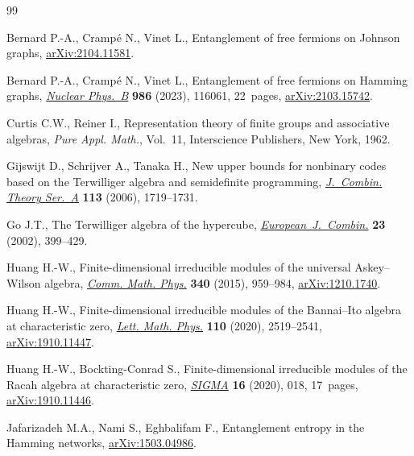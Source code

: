 \documentclass[10pt,a4paper]{amsart}
\numberwithin{equation}{section}
\begin{document}
\begin{thebibliography}{99}
\footnotesize\itemsep=0pt

Bernard P.-A., Cramp\'e N., Vinet L., Entanglement of free fermions on Johnson
 graphs, \href{https://arxiv.org/abs/2104.11581}{arXiv:2104.11581}.

Bernard P.-A., Cramp\'e N., Vinet L., Entanglement of free fermions on {H}amming
 graphs, \href{https://doi.org/10.1016/j.nuclphysb.2022.116061}{\textit{Nuclear Phys.~B}} \textbf{986} (2023), 116061, 22~pages,
 \href{https://arxiv.org/abs/2103.15742}{arXiv:2103.15742}.

Curtis C.W., Reiner I., Representation theory of finite groups and associative
 algebras, \textit{Pure Appl. Math.}, Vol.~11, Interscience Publishers, New
 York, 1962.

Gijswijt D., Schrijver A., Tanaka H., New upper bounds for nonbinary codes
 based on the {T}erwilliger algebra and semidefinite programming,
 \href{https://doi.org/10.1016/j.jcta.2006.03.010}{\textit{J.~Combin. Theory Ser.~A}} \textbf{113} (2006), 1719--1731.

Go J.T., The {T}erwilliger algebra of the hypercube,
 \href{https://doi.org/10.1006/eujc.2000.0514}{\textit{European~J.~Combin.}} \textbf{23} (2002), 399--429.

Huang H.-W., Finite-dimensional irreducible modules of the universal
 {A}skey--{W}ilson algebra, \href{https://doi.org/10.1007/s00220-015-2467-9}{\textit{Comm. Math. Phys.}} \textbf{340} (2015),
 959--984, \href{https://arxiv.org/abs/1210.1740}{arXiv:1210.1740}.

Huang H.-W., Finite-dimensional irreducible modules of the {B}annai--{I}to
 algebra at characteristic zero, \href{https://doi.org/10.1007/s11005-020-01306-9}{\textit{Lett. Math. Phys.}} \textbf{110}
 (2020), 2519--2541, \href{https://arxiv.org/abs/1910.11447}{arXiv:1910.11447}.

Huang H.-W., Bockting-Conrad S., Finite-dimensional irreducible modules of the
 {R}acah algebra at characteristic zero, \href{https://doi.org/10.3842/SIGMA.2020.018}{\textit{SIGMA}} \textbf{16} (2020),
 018, 17~pages, \href{https://arxiv.org/abs/1910.11446}{arXiv:1910.11446}.

Jafarizadeh M.A., Nami S., Eghbalifam F., Entanglement entropy in the {H}amming
 networks, \href{https://arxiv.org/abs/1503.04986}{arXiv:1503.04986}.


\end{thebibliography}
\end{document}
